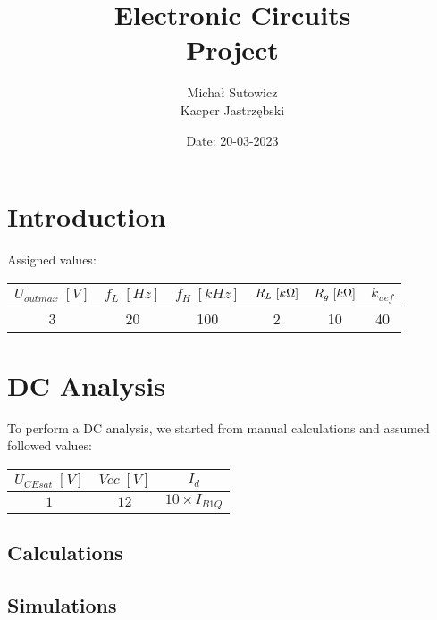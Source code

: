 \documentclass[12pt, a4paper]{extarticle}
\title{
	Electronic Circuits \\
	\vspace{\baselineskip}
	\large
	\textbf{Project}
}
\author{
	Michał Sutowicz\\
	Kacper Jastrzębski\\
}
\date{Date: 20-03-2023}
\begin{document}
	\maketitle
	\vspace{1.5cm}

	\tableofcontents

	\pagebreak

	\section{Introduction}

	Assigned values:

	\begin{center}
		\begin{tabular}{|c|c|c|c|c|c|}
			\hline
			$U_{outmax}\;[V]$ & $f_L\;[Hz]$ & $f_H\;[kHz]$ & $R_L\;[k\ohm]$ & $R_g\;[k\ohm]$ & $k_{uef}$\\
			\hline
			3 & 20 & 100 & 2 & 10 & 40  \\
			\hline
		\end{tabular}
	\end{center}

	\section{DC Analysis}

	To perform a DC analysis, we started from manual calculations and assumed followed values:


	\begin{center}
		\begin{tabular}{|c|c|c|}
			\hline
			$U_{CEsat}\;[V]$ & $Vcc\;[V]$ & $I_d$ \\
			\hline
			$1$ & $12$ & $10 \times I_{B1Q}$ \\
			\hline
		\end{tabular}
	\end{center}





	\subsection{Calculations}

	\subsection{Simulations}
\end{document}
